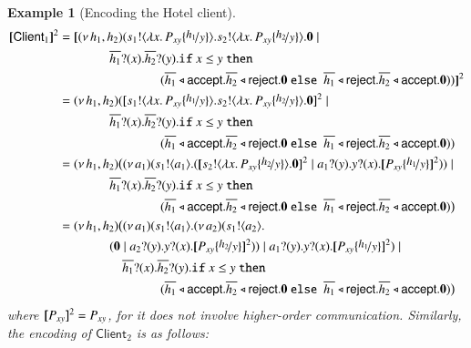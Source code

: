 \documentclass[preprint,11pt]{elsarticle}
\newtheorem{example}{Example}[section]
\newcommand{\accept}{\mathsf{accept}}
\newcommand{\reject}{\mathsf{reject}}
\newcommand{\Client}{\mathsf{Client}}
\begin{document}
{{\begin{example}[Encoding the Hotel client]
	\begin{align*}%
		\pmap{\Client_1}{2}   & =  \pmap{\newsp{h_1, h_2}{\bout{s_1}{\abs{x}{P_{xy} \subst{h_1}{y}}} \bout{s_2}{\abs{x}{P_{xy} \subst{h_2}{y}}} \inact \Par  \\
		 & 
		\qquad \qquad\binp{\dual{h_1}}{x} \binp{\dual{h_2}}{y}  \If x \leq y\   \Then
		\\
		 & \qquad\qquad \qquad \qquad (\bsel{\dual{h_1}}{\accept} \bsel{\dual{h_2}}{\reject} \inact \ \Else \ \bsel{\dual{h_1}}{\reject} \bsel{\dual{h_2}}{\accept} \inact )
		}}{2}
		\\
				   & =  \newsp{h_1, h_2}{\pmap{\bout{s_1}{\abs{x}{P_{xy} \subst{h_1}{y}}} \bout{s_2}{\abs{x}{P_{xy} \subst{h_2}{y}}} \inact }{2}\Par  \\
		 & 
		\qquad \qquad\binp{\dual{h_1}}{x} \binp{\dual{h_2}}{y}  \If x \leq y\   \Then
		\\
		 & \qquad\qquad \qquad \qquad (\bsel{\dual{h_1}}{\accept} \bsel{\dual{h_2}}{\reject} \inact \ \Else \ \bsel{\dual{h_1}}{\reject} \bsel{\dual{h_2}}{\accept} \inact )
		}
		\\
		& =  \newspb{h_1, h_2}{\newsp{a_1}{\bout{s_1}{a_1} (\pmap{\bout{s_2}{\abs{x}{P_{xy} \subst{h_2}{y}}} \inact}{2} \Par \binp{a_1}{y} \binp{y}{x} \pmap{P_{xy} \subst{h_1}{y}}{2})} \Par  \\
		 & 
		\qquad \qquad\binp{\dual{h_1}}{x} \binp{\dual{h_2}}{y}  \If x \leq y\   \Then
		\\
		 & \qquad\qquad \qquad \qquad (\bsel{\dual{h_1}}{\accept} \bsel{\dual{h_2}}{\reject} \inact \ \Else \ \bsel{\dual{h_1}}{\reject} \bsel{\dual{h_2}}{\accept} \inact )
		}
		\\
		& =  \newspb{h_1, h_2}{\newsp{a_1}{\bout{s_1}{a_1} \newsp{a_2}{\bout{s_1}{a_2} 
		\\
		&\qquad \qquad  (\inact \Par \binp{a_2}{y} \binp{y}{x} \pmap{P_{xy} \subst{h_2}{y}}{2})} \Par \binp{a_1}{y} \binp{y}{x} \pmap{P_{xy} \subst{h_1}{y}}{2}} \Par  \\
		 & 
		\qquad \qquad \quad \binp{\dual{h_1}}{x} \binp{\dual{h_2}}{y}  \If x \leq y\   \Then
		\\
		 & \qquad\qquad \qquad \qquad (\bsel{\dual{h_1}}{\accept} \bsel{\dual{h_2}}{\reject} \inact \ \Else \ \bsel{\dual{h_1}}{\reject} \bsel{\dual{h_2}}{\accept} \inact )
		}
		\end{align*}
where $[\!\![P_{xy}]\!\!]^2 =  P_{xy}$, for it does not involve higher-order communication.
Similarly, the encoding of $\Client_2$ is as follows:
\begin{align*}

\end{align*}
\end{example}}}
\end{document}
